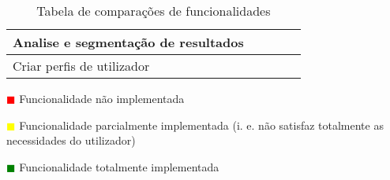 \begin{table}[!ht]
\begin{center}
\begin{tabular}{|p{4cm}|p{0.1cm}|p{0.1cm}|p{0.1cm}|p{0.1cm}|}
			Analise e segmentação de resultados & \cellcolor{green!80}  & \cellcolor{green!80}  & \cellcolor{green!80} & \cellcolor{green!80} \\ \hline
			
			Criar perfis de utilizador & \cellcolor{red!80}   & \cellcolor{red!80}  & \cellcolor{red!80} & \cellcolor{green!80}  \\ \hline
			
			
			
		\end{tabular}
	\end{center}
	\hspace{1.2cm}	\textcolor{red}{$\blacksquare$} Funcionalidade não implementada
	
	\hspace{1.2cm}     \textcolor{yellow}{$\blacksquare$} Funcionalidade parcialmente implementada (i. e. não satisfaz totalmente as necessidades do utilizador)
	
	\hspace{1.2cm}     \textcolor{green}{$\blacksquare$} Funcionalidade totalmente implementada 
	\begin{center}
		\caption{Tabela de comparações de funcionalidades}
		\label{tab:comparacao1}
	\end{center}
\end{table}



